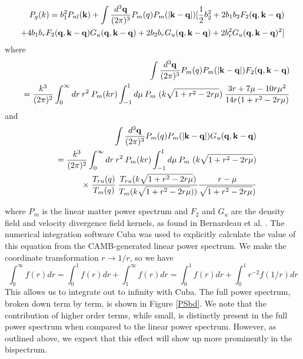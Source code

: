 \documentclass[12pt]{article}
\begin{document}
\begin{eqnarray}
P_{g}(k) = b_{1}^{2}P_{nl}({\bf k}) + \int\frac{d^{3}\bf q}{(2\pi)^{3}}P_{m}(q)P_{m}(|{\bf k-q}|)[\frac{1}{2}b_{2}^{2}+2b_{1}b_{2}F_{2}({\bf q, k- q}) \\
+4b_{1}b_{r}F_{2}({\bf q, k- q})G_{u}({\bf q, k- q})+2b_{2}b_{r}G_{u}({\bf q, k- q})+2b_{r}^{2}G_{u}({\bf q, k- q})^{2}]
\nonumber \end{eqnarray}
where
\begin{eqnarray}
&&\int\frac{d^{3}\bf q}{(2\pi)^{3}}P_{m}(q)P_{m}(|{\bf k - q}|) F_{2}({\bf q, k- q}) \\
&&= \frac{k^{3}}{(2\pi)^{2}}\int_{0}^{\infty}dr\: r^{2}\: P_{m}(kr)\int_{-1}^{1}d\mu\: P_{m}\;(k\sqrt{1+r^{2}-2r\mu})\:\frac{3r+7\mu-10r\mu^{2}}{14r(1+r^{2}-2r\mu)}
\nonumber \end{eqnarray}
and 
\begin{eqnarray}
&&\int \frac{d^{3}\bf q}{(2\pi)^{3}}P_{m}(q)P_{m}(|{\bf k - q}|) G_{u}({\bf q, k- q}) \\
&&= \frac{k^{3}}{(2\pi)^{2}}\int_{0}^{\infty}dr\: r^{2}\: P_{m}(kr)\int_{-1}^{1}d\mu\: P_{m}\;(k\sqrt{1+r^{2}-2r\mu}) \nonumber \\
&&\times\;\frac{T_{ru}(q)}{T_{m}(q)}\:\frac{T_{ru}(k\sqrt{1+r^{2}-2r\mu})}{T_{m}(k\sqrt{1+r^{2}-2r\mu}))}\frac{r-\mu}{\sqrt{1+r^{2}-2r\mu})} 
\nonumber \end{eqnarray}

where $P_{m}$ is the linear matter power spectrum and $F_{2}$ and $G_{u}$ are the density field and velocity divergence field kernels, as found in Bernardeau et al. \cite{Yooetal}\cite{Bernardeau}. The numerical integration software Cuba was used to  explicitly calculate the value of this equation from the CAMB-generated linear power spectrum. We make the coordinate transformation $r \to 1/r $, so we have
\begin{equation}
\int_{0}^{\infty} f(r) dr = \int_{0}^{1} f(r) dr + \int_{1}^{\infty} f(r) dr = \int_{0}^{1} f(r) dr +\int_{0}^{1} r^{-2} f(1/r) dr
\end{equation}
This allows us to integrate out to infinity with Cuba. The full power spectrum, broken down term by term, is shown in Figure \ref{PSbd}. We note that the contribution of higher order terms, while small, is distinctly present in the full power spectrum when compared to the linear power spectrum. However, as outlined above, we expect that this effect will show up more prominently in the bispectrum.  
\end{document}

